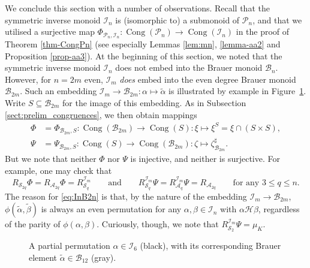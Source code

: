 \documentclass[11pt,a4paper]{article}
\newcommand{\I}{\mathcal I}
\renewcommand{\S}{\mathcal S}
\newcommand{\A}{\mathcal A}
\newcommand{\B}{\mathcal B}
\renewcommand{\P}{\mathcal P}
\renewcommand{\H}{\mathrel{\mathscr H}}
\newcommand{\al}{\alpha}
\newcommand{\be}{\beta}
\newcommand{\alt}{\widetilde{\al}}
\newcommand{\bet}{\widetilde{\be}}
\newcommand{\Cong}{\operatorname{Cong}}
\newcommand{\1}{\id_n}
\newcommand{\mt}{\mapsto}
\newcommand{\sub}{\subseteq}
\newcommand{\AND}{\qquad\text{and}\qquad}
\newcommand{\stline}[2]{\draw(#1,2)--(#2,0);}
\newcommand{\stlines}[1]{{\foreach \x/\y in {#1} { \stline{\x}{\y} }}}
\newcommand{\darcxx}[4]{\draw[#4](#1,0)arc(180:90:#3) (#1+#3,#3)--(#2-#3,#3) (#2-#3,#3) arc(90:0:#3);}
\newcommand{\uarcxx}[4]{\draw[#4](#1,2)arc(180:270:#3) (#1+#3,2-#3)--(#2-#3,2-#3) (#2-#3,2-#3) arc(270:360:#3);}
\newcommand{\stlinex}[3]{\draw[#3](#1,2)--(#2,0);}
\numberwithin{equation}{section}
\theoremstyle{definition}
\begin{document}
\begin{itemize}
\begin{itemize}
\begin{itemize}
\begin{itemize}
\begin{itemize}
\begin{itemize}
\begin{itemize}
We conclude this section with a number of observations.
Recall that the symmetric inverse monoid $\I_n$ is (isomorphic to) a submonoid of $\P_n$, and that we utilised a surjective map $\Phi_{\P_n,\I_n}:\Cong(\P_n)\to\Cong(\I_n)$ in the proof of Theorem \ref{thm-CongPn} (see especially Lemmas \ref{lem:mn}, \ref{lemma-aa2} and Proposition \ref{prop-aa3}).  
%
At the beginning of this section, we noted that the symmetric inverse monoid $\I_n$ does not embed into the Brauer monoid $\B_{n}$.  
However, for $n=2m$ even, 
$\I_m$ \emph{does} embed into the even degree Brauer monoid $\B_{2m}$.
Such an embedding $\I_m\to\B_{2m}:\al\mt\alt$ is illustrated by example in Figure~\ref{fig:ImB2m}.  Write $S\sub\B_{2m}$ for the image of this embedding.  As in Subsection \ref{sect:prelim_congruences}, we then obtain mappings
\begin{align*}
\Phi&=\Phi_{\B_{2m},S}:\Cong(\B_{2m})\to\Cong(S):\xi\mt\xi^S=\xi\cap(S\times S),\\
\Psi&=\Psi_{\B_{2m},S}:\Cong(S)\to\Cong(\B_{2m}):\zeta\mt\zeta_{\B_{2m}}^\sharp.
\end{align*}
But we note that neither $\Phi$ nor $\Psi$ is injective, and neither is surjective.  For example, one may check that
\begin{equation}\label{eq:InB2n}
R_{\S_{2q}}\Phi=R_{\A_{2q}}\Phi=R_{\S_q}^{\I_m} \AND
R^{\I_m}_{\S_{q}}\Psi=R^{\I_m}_{\A_{q}}\Psi=R_{\A_{2q}} \qquad\text{for any $3\leq q\leq n$.}
\end{equation}
The reason for \eqref{eq:InB2n} is that, by the nature of the embedding $\I_m\to\B_{2m}$, $\phi(\alt,\bet)$ is always an even permutation for any $\al,\be\in\I_n$ with $\al\H\be$, regardless of the parity of $\phi(\al,\be)$.
%
Curiously, though, we note that $R_{\S_2}^{\I_m}\Psi=\mu_K$.  


\begin{figure}[ht]
\begin{center}
\end{center}
\vspace{-5mm}
\caption{A partial permutation $\al\in\I_6$ (black), with its corresponding Brauer element $\alt\in\B_{12}$ (gray).}
\label{fig:ImB2m}
\end{figure}




\end{itemize}
\end{itemize}
\end{itemize}
\end{itemize}
\end{itemize}
\end{itemize}
\end{itemize}
\end{document}
